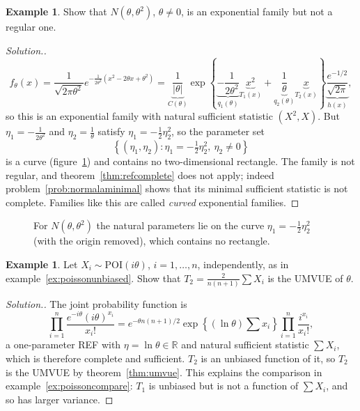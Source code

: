 \documentclass[12pt,a4paper]{report}
\theoremstyle{definition}
\newtheorem{exa}[thm]{Example}
\newenvironment{solution}
  {\renewcommand{\qedsymbol}{}\begin{proof}[\textit{Solution}.]}
  {\end{proof}}
\begin{document}
\begin{exa}
\label{ex:normalthetanotref}
Show that $N(\theta, \theta^2)$, $\theta\ne 0$, is an exponential family but not a
regular one.
\end{exa}

\begin{solution}
\[f_\theta(x) = \frac{1}{\sqrt{2\pi\theta^2}}e^{-\frac{1}{2\theta^2}(x^2 - 2\theta x + \theta^2)}
= \underbrace{\frac{1}{|\theta|}}_{C(\theta)}\exp\left\{\underbrace{-\frac{1}{2\theta^2}}_{q_1(\theta)}\underbrace{x^2}_{T_1(x)}
+ \underbrace{\frac1\theta}_{q_2(\theta)}\underbrace{x}_{T_2(x)}\right\}\underbrace{\frac{e^{-1/2}}{\sqrt{2\pi}}}_{h(x)},\]
so this is an exponential family with natural sufficient statistic $(X^2, X)$. But
$\eta_1 = -\frac{1}{2\theta^2}$ and $\eta_2 = \frac1\theta$ satisfy
$\eta_1 = -\frac12\eta_2^2$, so the parameter set
\[\left\{(\eta_1, \eta_2) : \eta_1 = -\tfrac12\eta_2^2,\ \eta_2\ne 0\right\}\]
is a curve (figure~\ref{fig:curvedfamily}) and contains no two-dimensional
rectangle. The family is not regular, and theorem~\ref{thm:refcomplete} does not
apply; indeed problem~\ref{prob:normalaminimal} shows that its minimal sufficient
statistic is not complete. Families like this are called \emph{curved}
exponential families.
\end{solution}

\begin{figure}[H]
\centering
{}
\caption{For $N(\theta, \theta^2)$ the natural parameters lie on the curve
$\eta_1 = -\frac12\eta_2^2$ (with the origin removed), which contains no
rectangle.}
\label{fig:curvedfamily}
\end{figure}

\begin{exa}
\label{ex:poissonumvue}
Let $X_i\sim\text{POI}(i\theta)$, $i = 1, \dots, n$, independently, as in
example~\ref{ex:poissonunbiased}. Show that $T_2 = \frac{2}{n(n + 1)}\sum X_i$ is the
UMVUE of $\theta$.
\end{exa}

\begin{solution}
The joint probability function is
\[\prod_{i=1}^n\frac{e^{-i\theta}(i\theta)^{x_i}}{x_i!}
= e^{-\theta n(n + 1)/2}\exp\left\{(\ln\theta)\sum x_i\right\}\prod_{i=1}^n\frac{i^{x_i}}{x_i!},\]
a one-parameter REF with $\eta = \ln\theta\in\mathbb{R}$ and natural sufficient
statistic $\sum X_i$, which is therefore complete and sufficient. $T_2$ is an
unbiased function of it, so $T_2$ is the UMVUE by theorem~\ref{thm:umvue}. This
explains the comparison in example~\ref{ex:poissoncompare}: $T_1$ is unbiased but is
not a function of $\sum X_i$, and so has larger variance.
\end{solution}
\end{document}
